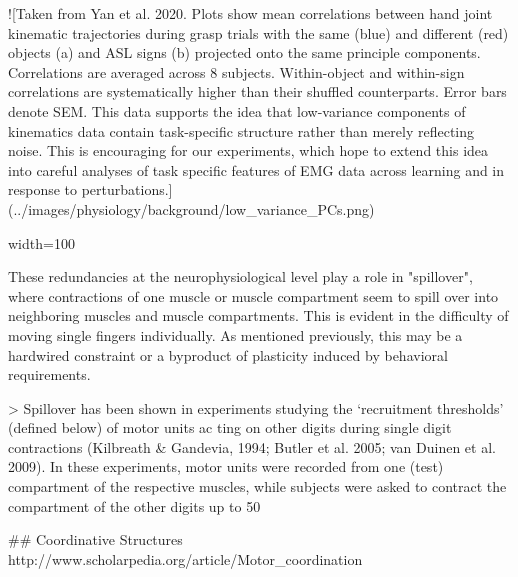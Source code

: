 \documentclass[../main.tex]{subfiles}
\begin{document}
![Taken from Yan et al. 2020. Plots show mean correlations between hand joint kinematic trajectories during grasp trials with the same (blue) and different (red) objects (a) and ASL signs (b) projected onto the same principle components. Correlations are averaged across 8 subjects. Within-object and within-sign correlations are systematically higher than their shuffled counterparts. Error bars denote SEM. This data supports the idea that low-variance components of kinematics data contain task-specific structure rather than merely reflecting noise. This is encouraging for our experiments, which hope to extend this idea into careful analyses of task specific features of EMG data across learning and in response to perturbations.](../images/physiology/background/low_variance_PCs.png){width=100%

These redundancies at the neurophysiological level play a role in "spillover", where contractions of one muscle or muscle compartment seem to spill over into neighboring muscles and muscle compartments. This is evident in the difficulty of moving single fingers individually. As mentioned previously, this may be a hardwired constraint or a byproduct of plasticity induced by behavioral requirements. 

> Spillover has been shown in experiments studying the ‘recruitment thresholds’ (defined below) of motor units ac ting on other digits during single digit contractions (Kilbreath & Gandevia, 1994; Butler et al. 2005; van Duinen et al. 2009). In these experiments, motor units were recorded from one (test) compartment of the respective muscles, while subjects were asked to contract the compartment of the other digits up to 50%




## Coordinative Structures
http://www.scholarpedia.org/article/Motor_coordination

}
\end{document}
